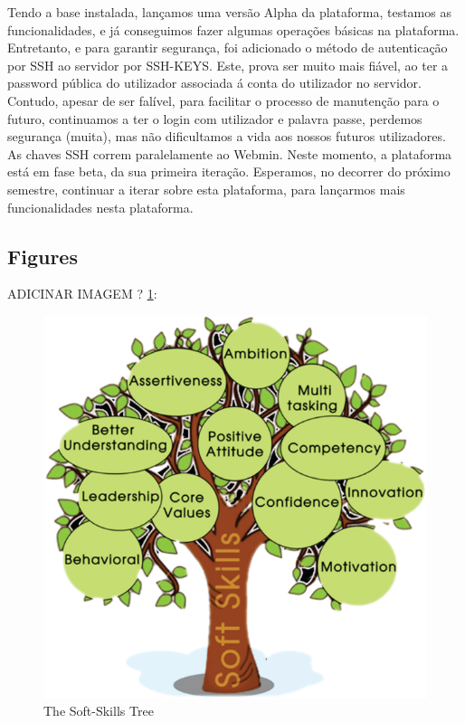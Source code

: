 \documentclass[a4paper,12pt,journal,twoside,compsoc]{PPIEEEtran}
\begin{document}
Tendo a base instalada, lançamos uma versão Alpha da plataforma, testamos as funcionalidades, e já conseguimos fazer algumas operações básicas na plataforma.
Entretanto, e para garantir segurança, foi adicionado o método de autenticação por SSH ao servidor por SSH-KEYS. Este, prova ser muito mais fiável, ao ter a password pública do utilizador associada á conta do utilizador no servidor. Contudo, apesar de ser falível, para facilitar o processo de manutenção para o futuro, continuamos a ter o login com utilizador e palavra passe, perdemos segurança (muita), mas não dificultamos a vida aos nossos futuros utilizadores.
As chaves SSH correm paralelamente ao Webmin.
Neste momento, a plataforma está em fase beta, da sua primeira iteração. Esperamos, no decorrer do próximo semestre, continuar a iterar sobre esta plataforma, para lançarmos mais funcionalidades nesta plataforma.
\subsection{Figures}
ADICINAR IMAGEM ? 
\ref{fig_sim}:

\begin{figure}[htb]
\centering
\includegraphics[width=1\linewidth]{soft_skills.png}
\caption{The Soft-Skills Tree}
\label{fig_sim}
\end{figure}
\end{document}
